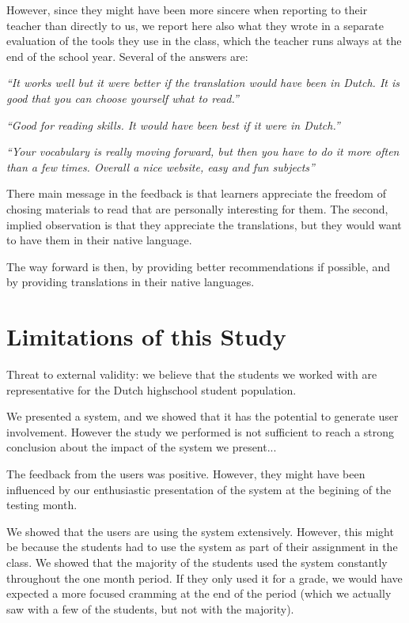 However, since they might have been more sincere when reporting to their teacher than directly to us, we report here also what they wrote in a separate evaluation of the tools they use in the class, which the teacher runs always at the end of the school year. Several of the answers are: 

\begin{description}
  \item {\em ``It works well but it were better if the translation would have been in Dutch. It is good that you can choose yourself what to read.''}
  \item {\em ``Good for reading skills. It would have been best if it were in Dutch.''}
  \item {\em ``Your vocabulary is really moving forward, but then you have to do it more often than a few times. Overall a nice website, easy and fun subjects''}
\end{description}

There main message in the feedback is that learners appreciate the freedom of chosing materials to read that are personally interesting for them. The second, implied observation is that they appreciate the translations, but they would want to have them in their native language. 

The way forward is then, by providing better recommendations if possible, and by providing translations in their native languages.



\section{Limitations of this Study}

Threat to external validity: we believe that the students we worked with are representative for the Dutch highschool student population. 

We presented a system, and we showed that it has the potential to generate user involvement. However the study we performed is not sufficient to reach a strong conclusion about the impact of the system we present... 

The feedback from the users was positive. However, they might have been influenced by our enthusiastic presentation of the system at the begining of the testing month. 

We showed that the users are using the system extensively. However, this might be because the students had to use the system as part of their assignment in the class. We showed that the majority of the students used the system constantly throughout the one month period. If they only used it for a grade, we would have expected a more focused cramming at the end of the period (which we actually saw with a few of the students, but not with the majority). 

